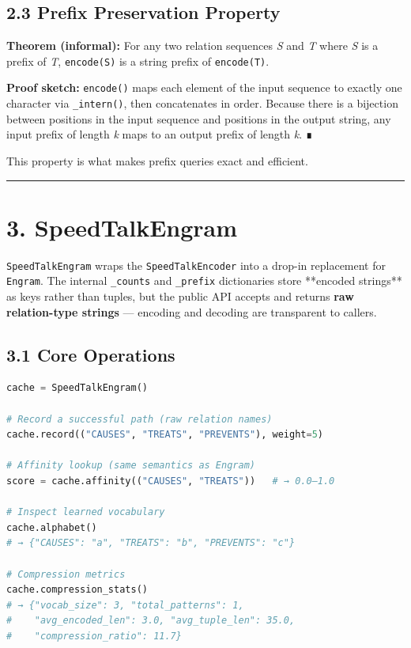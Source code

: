 \subsection*{2.3 Prefix Preservation Property}

\textbf{Theorem (informal):} For any two relation sequences \textit{S} and \textit{T} where \textit{S} is a
prefix of \textit{T}, \texttt{encode(S)} is a string prefix of \texttt{encode(T)}.

\textbf{Proof sketch:} \texttt{encode()} maps each element of the input sequence to exactly one
character via \texttt{\_intern()}, then concatenates in order.  Because there is a bijection
between positions in the input sequence and positions in the output string, any input
prefix of length \textit{k} maps to an output prefix of length \textit{k}.  ∎

This property is what makes prefix queries exact and efficient.

\medskip\noindent\rule{\linewidth}{0.4pt}\medskip

\section*{3. SpeedTalkEngram}

\texttt{SpeedTalkEngram} wraps the \texttt{SpeedTalkEncoder} into a drop-in replacement for
\texttt{Engram}.  The internal \texttt{\_counts} and \texttt{\_prefix} dictionaries store **encoded
strings** as keys rather than tuples, but the public API accepts and returns
\textbf{raw relation-type strings} --- encoding and decoding are transparent to callers.

\subsection*{3.1 Core Operations}

\begin{lstlisting}[language=Python]
cache = SpeedTalkEngram()

# Record a successful path (raw relation names)
cache.record(("CAUSES", "TREATS", "PREVENTS"), weight=5)

# Affinity lookup (same semantics as Engram)
score = cache.affinity(("CAUSES", "TREATS"))   # → 0.0–1.0

# Inspect learned vocabulary
cache.alphabet()
# → {"CAUSES": "a", "TREATS": "b", "PREVENTS": "c"}

# Compression metrics
cache.compression_stats()
# → {"vocab_size": 3, "total_patterns": 1,
#    "avg_encoded_len": 3.0, "avg_tuple_len": 35.0,
#    "compression_ratio": 11.7}
\end{lstlisting}

